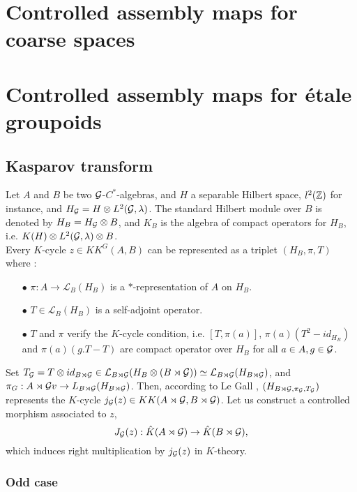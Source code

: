 \section{Controlled assembly maps for coarse spaces}

\section{Controlled assembly maps for étale groupoids}

\subsection{Kasparov transform}

Let $A$ and $B$ be two $\mathcal G$-$C^*$-algebras, and $H$ a separable Hilbert space, $l^2(\mathbb Z)$ for instance, and $H_\mathcal G= H\otimes L^2(\mathcal G,\lambda)$. The standard Hilbert module over $B$ is denoted by $H_B=H_\mathcal G\otimes B$, and $K_B$ is the algebra of compact operators for $H_B$, i.e. $K(H)\otimes L^2(\mathcal G,\lambda)\otimes B$. \\

Every $K$-cycle $z\in KK^G(A,B)$ can be represented as a triplet $(H_B, \pi, T)$ where :
\begin{itemize}
\item[$\bullet$]$\pi : A\rightarrow \mathcal L_B(H_B)$ is a $*$-representation of $A$ on $H_B$.
\item[$\bullet$]$T\in \mathcal L_B(H_B)$ is a self-adjoint operator.
\item[$\bullet$] $T$ and $\pi$ verify the $K$-cycle condition, i.e. $[T,\pi(a)]$, $\pi(a)(T^2-id_{H_B})$ and $\pi(a)(g.T-T)$ are compact operator over $H_B$ for all $a\in A, g\in \mathcal G$.\\
\end{itemize}

Set $T_\mathcal G= T\otimes id_{B\rtimes \mathcal G}\in \mathcal L_{B\rtimes \mathcal G}(H_B\otimes (B\rtimes \mathcal G))\simeq \mathcal L_{B\rtimes \mathcal G}(H_{B\rtimes\mathcal G})$, and $\pi_G: A\rtimes \mathcal G v\rightarrow L_{B\rtimes \mathcal G}(H_{B\rtimes\mathcal G})$. Then, according to Le Gall \cite{LeGall}, $(H_{B\rtimes\mathcal G, \pi_\mathcal G, T_\mathcal G})$ represents the $K$-cycle $j_\mathcal G(z)\in KK(A\rtimes \mathcal G,B\rtimes \mathcal G)$. Let us construct a controlled morphism associated to $z$,
\[J_\mathcal G(z) : \hat K(A\rtimes \mathcal G)\rightarrow \hat K(B\rtimes\mathcal G), \]
which induces right multiplication by $j_\mathcal G(z)$ in $K$-theory.\\

\subsubsection{Odd case}


